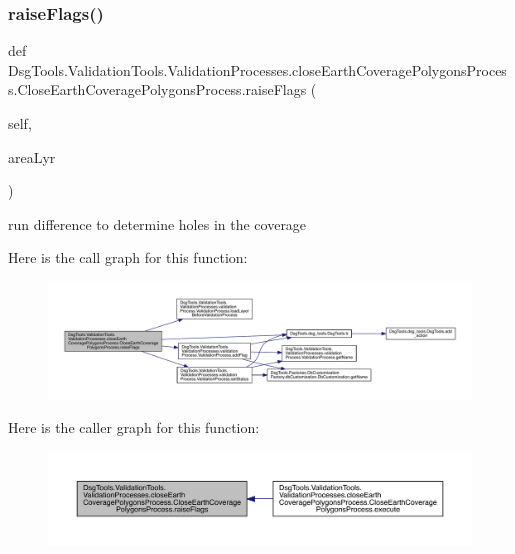 \subsubsection{\texorpdfstring{raise\+Flags()}{raiseFlags()}}
{\footnotesize\ttfamily def Dsg\+Tools.\+Validation\+Tools.\+Validation\+Processes.\+close\+Earth\+Coverage\+Polygons\+Process.\+Close\+Earth\+Coverage\+Polygons\+Process.\+raise\+Flags (\begin{DoxyParamCaption}\item[{}]{self,  }\item[{}]{area\+Lyr }\end{DoxyParamCaption})}

\begin{DoxyVerb}run difference to determine holes in the coverage
\end{DoxyVerb}
 Here is the call graph for this function\+:
\nopagebreak
\begin{figure}[H]
\begin{center}
\leavevmode
\includegraphics[width=350pt]{class_dsg_tools_1_1_validation_tools_1_1_validation_processes_1_1close_earth_coverage_polygons_pcbfc5684de655aabbd7cec48624aa747_ad2878b8cfbcd4ee0ef2c53c2fc11fa73_cgraph}
\end{center}
\end{figure}
Here is the caller graph for this function\+:
\nopagebreak
\begin{figure}[H]
\begin{center}
\leavevmode
\includegraphics[width=350pt]{class_dsg_tools_1_1_validation_tools_1_1_validation_processes_1_1close_earth_coverage_polygons_pcbfc5684de655aabbd7cec48624aa747_ad2878b8cfbcd4ee0ef2c53c2fc11fa73_icgraph}
\end{center}
\end{figure}
\mbox{\label{class_dsg_tools_1_1_validation_tools_1_1_validation_processes_1_1close_earth_coverage_polygons_pcbfc5684de655aabbd7cec48624aa747_a1c9eacfba3e9a9c52827e28ec3c9f5a6}} 
